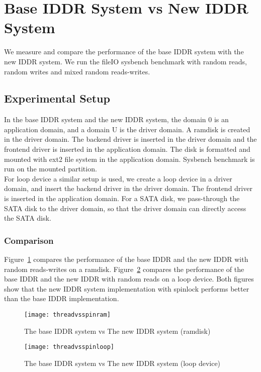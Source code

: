 \section{Base IDDR System vs New IDDR System}
We measure and compare the performance of the base IDDR system with the new IDDR system. We run the fileIO sysbench benchmark with random reads, random writes and mixed random reads-writes. 
\subsection*{Experimental Setup}
In the base IDDR system and the new IDDR system, the domain 0 is an application domain, and a domain U is the driver domain. A ramdisk is created in the driver domain. The backend driver is inserted in the driver domain and the frontend driver is inserted in the application domain. The disk is formatted and mounted with ext2 file system in the application domain. Sysbench benchmark is run on the mounted partition. 
\\[3mm]
For loop device a similar setup is used, we create a loop device in a driver domain, and insert the backend driver in the driver domain. The frontend driver is inserted in the application domain. For a SATA disk, we pass-through the SATA disk to the driver domain, so that the driver domain can directly access the SATA disk. 
\subsubsection*{Comparison}
Figure~\ref{fig:threadvsspinram} compares the performance of the base IDDR and the new IDDR with random reads-writes on a ramdisk. Figure~\ref{fig:threadvsspinloop} compares the performance of the base IDDR and the new IDDR with random reads on a loop device. Both figures show that the new IDDR system implementation with spinlock performs better than the base IDDR implementation. 
\begin{figure}[!ht]
\centering
\texttt{[image: threadvsspinram]}
\caption{The base IDDR system vs The new IDDR system (ramdisk)}
\label{fig:threadvsspinram}
\end{figure}
\begin{figure}[!ht]
\centering
\texttt{[image: threadvsspinloop]}
\caption{The base IDDR system vs The new IDDR system (loop device)}
\label{fig:threadvsspinloop}
\end{figure}


